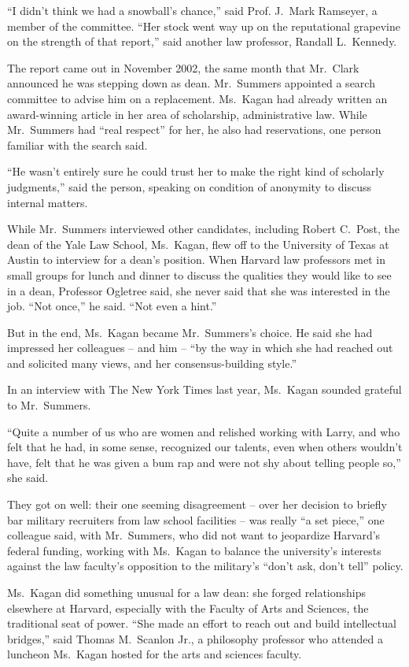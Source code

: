 ﻿\documentclass[12pt]{article}
\begin{document}
``I didn't think we had a snowball's chance,'' said Prof. J.~Mark Ramseyer, a member of the
committee. ``Her stock went way up on the reputational grapevine on the strength of that report,''
said another law professor, Randall L.~Kennedy.

The report came out in November 2002, the same month that Mr.~Clark announced he was stepping down
as dean. Mr.~Summers appointed a search committee to advise him on a replacement. Ms.~Kagan had
already written an award-winning article in her area of scholarship, administrative law. While
Mr.~Summers had ``real respect'' for her, he also had reservations, one person familiar with the
search said.

``He wasn't entirely sure he could trust her to make the right kind of scholarly judgments,'' said
the person, speaking on condition of anonymity to discuss internal matters.

While Mr.~Summers interviewed other candidates, including Robert C.~Post, the dean of the Yale Law
School, Ms.~Kagan, flew off to the University of Texas at Austin to interview for a dean's position.
When Harvard law professors met in small groups for lunch and dinner to discuss the qualities they
would like to see in a dean, Professor Ogletree said, she never said that she was interested in the
job. ``Not once,'' he said. ``Not even a hint.''

But in the end, Ms.~Kagan became Mr.~Summers's choice. He said she had impressed her colleagues --
and him -- ``by the way in which she had reached out and solicited many views, and her
consensus-building style.''

In an interview with The New York Times last year, Ms.~Kagan sounded grateful to Mr.~Summers.

``Quite a number of us who are women and relished working with Larry, and who felt that he had, in
some sense, recognized our talents, even when others wouldn't have, felt that he was given a bum rap
and were not shy about telling people so,'' she said.

They got on well: their one seeming disagreement -- over her decision to briefly bar military
recruiters from law school facilities -- was really ``a set piece,'' one colleague said, with
Mr.~Summers, who did not want to jeopardize Harvard's federal funding, working with Ms.~Kagan to
balance the university's interests against the law faculty's opposition to the military's ``don't
ask, don't tell'' policy.

Ms.~Kagan did something unusual for a law dean: she forged relationships elsewhere at Harvard,
especially with the Faculty of Arts and Sciences, the traditional seat of power. ``She made an
effort to reach out and build intellectual bridges,'' said Thomas M.~Scanlon Jr., a philosophy
professor who attended a luncheon Ms.~Kagan hosted for the arts and sciences faculty.
\end{document}
